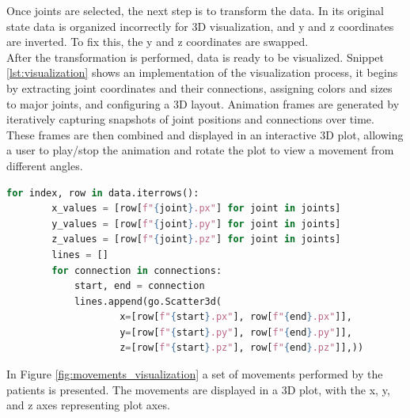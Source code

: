         Once joints are selected, the next step is to transform the data. In its original state data is organized incorrectly for 3D visualization, and y and z coordinates are inverted. To fix this, the y and z coordinates are swapped. \\

        After the transformation is performed, data is ready to be visualized. Snippet \ref{lst:visualization} shows an implementation of the visualization process, it begins by extracting joint coordinates and their connections, assigning colors and sizes to major joints, and configuring a 3D layout. Animation frames are generated by iteratively capturing snapshots of joint positions and connections over time. These frames are then combined and displayed in an interactive 3D plot, allowing a user to play/stop the animation and rotate the plot to view a movement from different angles.

        \begin{lstlisting}[caption={Code snippet creates connecting lines between joints using their 3D coordinates, enabling visualization of joint movements.}, label={lst:visualization}, language=Python]            
    for index, row in data.iterrows():
        x_values = [row[f"{joint}.px"] for joint in joints]
        y_values = [row[f"{joint}.py"] for joint in joints]
        z_values = [row[f"{joint}.pz"] for joint in joints]
        lines = []
        for connection in connections:
            start, end = connection
            lines.append(go.Scatter3d(
                    x=[row[f"{start}.px"], row[f"{end}.px"]],
                    y=[row[f"{start}.py"], row[f"{end}.py"]],
                    z=[row[f"{start}.pz"], row[f"{end}.pz"]],))
        \end{lstlisting}
        
        \newpage

        In Figure \ref{fig:movements_visualization} a set of movements performed by the patients is presented. The movements are displayed in a 3D plot, with the x, y, and z axes representing plot axes. 

